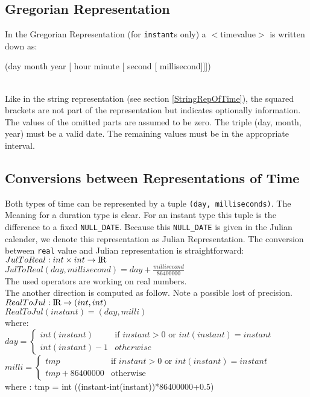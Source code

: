 \documentclass[english,a4paper]{article}
\newcommand{\R}{\ensuremath{\mbox{I\hspace*{-0.1em}R}}}
\begin{document}
\subsection{Gregorian Representation}
In the Gregorian Representation (for {\tt instant}s only)
a $<$timevalue$>$ is written 
down as:\\
\begin{tt}
  \begin{small}
      (day month year [ hour minute [ second [ millisecond]]])
  \end{small}
\end{tt}\\
Like in the string representation (see section \ref{StringRepOfTime}),
the squared brackets are not part of the representation but indicates
optionally information. The values of the omitted parts are assumed to be zero.
The triple (day, month, year) must be a valid date. The remaining
values must be in the appropriate interval.


\subsection{Conversions between Representations of Time}
\label{TimeConversions}
Both types of time can be represented by a tuple {\tt (day, milliseconds)}. 
The Meaning for a duration type is clear. For an instant type this tuple
is the difference to a fixed {\tt NULL\_DATE}. Because this {\tt NULL\_DATE}
is given in the Julian calender, we denote this representation as 
Julian Representation.
The conversion between {\tt real} value and Julian representation
is straightforward:\\
$ JulToReal : int \times int \rightarrow \R$ \\
$ JulToReal(day, millisecond) = day + \frac{millisecond}{86400000}$ \\
The used operators are working on real numbers.\\[1em]
The another direction is computed as follow. Note a possible lost of 
precision.\\
$ RealToJul : \R \rightarrow (int,int)$ \\
$ RealToJul(instant) = (day,milli) $ \\
where:\\
{\small
$ day = \left\{ \begin{array}{ll}
                    int(instant) & \mbox{if } instant > 0 
                                   \mbox{ or } int(instant)=instant\\
                    int(instant)-1 & otherwise
                \end{array} \right. $\\[1em]
$ milli = \left\{ \begin{array}{ll}
                         tmp & \mbox{if } instant > 0 \mbox{ or } int(instant)=instant\\
                         tmp + 86400000 & \mbox{otherwise}
                      \end{array}\right. $ \\[1em]
\hspace*{1cm}where : tmp = int ((instant-int(instant))*86400000+0.5)}\vspace{1cm}
              
\end{document}
